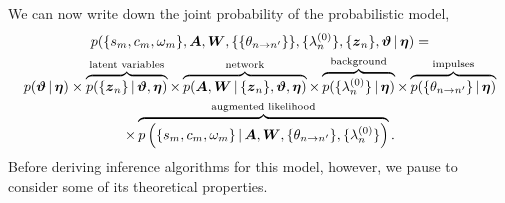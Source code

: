 We can now write down the joint probability of the probabilistic model,
\begin{multline}
\label{eq:hawkes_complete_model}
p(\{s_m, c_m, \omega_m\}, \boldsymbol{A}, \boldsymbol{W}, \{\{\theta_{n \to n'}\}\}, \{\lambda^{(0)}_{n}\}, \{\boldsymbol{z}_n\}, \boldsymbol{\vartheta} \,|\, \boldsymbol{\eta}) 
=  \\
p(\boldsymbol{\vartheta} \,|\, \boldsymbol{\eta})
\times \overbrace{p(\{\boldsymbol{z}_n\} \,|\, \boldsymbol{\vartheta}, \boldsymbol{\eta})}^\text{latent variables}
\times \overbrace{p(\boldsymbol{A}, \boldsymbol{W} \,|\, \{\boldsymbol{z}_{n}\}, \boldsymbol{\vartheta}, \boldsymbol{\eta})}^\text{network} 
\times \overbrace{p(\{\lambda^{(0)}_{n}\} \,|\, \boldsymbol{\eta})}^\text{background}
\times \overbrace{p(\{\theta_{n\to n'}\} \,|\, \boldsymbol{\eta})}^\text{impulses} \\
\times \overbrace{  p \left(\{s_m, c_m, \omega_m\} \,|\, \boldsymbol{A}, \boldsymbol{W}, \{\theta_{n \to n'}\}, \{\lambda^{(0)}_{n}\} \right) }^\text{augmented likelihood}.
\end{multline}
Before deriving inference algorithms for this model, however, we pause 
to consider some of its theoretical properties.





